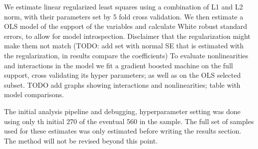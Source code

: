 We estimate linear regularized least squares using a combination of L1 and L2 norm, with their parameters set by 5 fold cross validation. 
We then estimate a OLS model of the support of the variables and calculate White robust standard errors, to allow for model introspection. 
Disclaimer that the regularization might make them not match (TODO: add set with normal SE that is estimated with the regularization, in results compare the coefficients) 
To evaluate nonlinearities and interactions  in the model we fit a gradient boosted machine on the full support, cross validating its hyper parameters; as well as on the OLS selected subset.  TODO add graphs showing interactions and nonlinearities; table with model comparisons.


The initial analysis pipeline and debugging, hyperparameter setting was done using only th initial 270 of the eventual 560 in the sample. The full set of samples used for these estimates was only estimated before writing the results section. The method will not be revised beyond this point.
